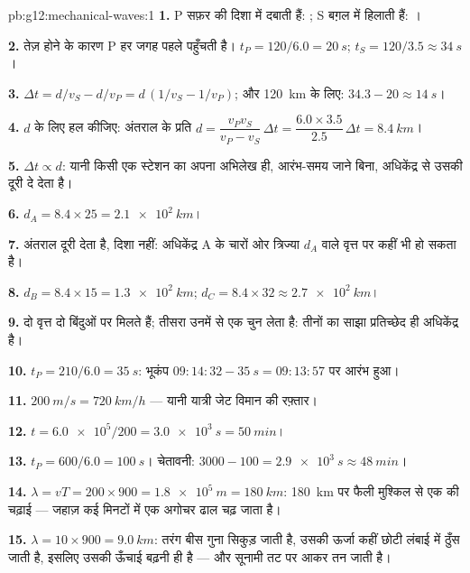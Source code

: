 \begin{solution}{pb:g12:mechanical-waves:1}
\textbf{1.} P सफ़र की दिशा में दबाती हैं: ; S बग़ल में
हिलाती हैं: ।

\textbf{2.} तेज़ होने के कारण P हर जगह पहले पहुँचती है। $t_P = 120/6.0 = \qty{20}{s}$; $t_S = 120/3.5 \approx \qty{34}{s}$।

\textbf{3.} $\Delta t = d/v_S - d/v_P = d\,(1/v_S - 1/v_P)$; और \qty{120}{km} के लिए: $34.3 - 20 \approx \qty{14}{s}$।

\textbf{4.} $d$ के लिए हल कीजिए: अंतराल के प्रति  $d = \dfrac{v_P v_S}{v_P - v_S}\,\Delta t
= \dfrac{6.0 \times 3.5}{2.5}\,\Delta t = \qty{8.4}{km}$।

\textbf{5.} $\Delta t \propto d$: यानी किसी एक स्टेशन का अपना अभिलेख ही, आरंभ-समय जाने
बिना, अधिकेंद्र से उसकी दूरी दे देता है।

\textbf{6.} $d_A = 8.4 \times 25 = \qty{2.1e2}{km}$।

\textbf{7.} अंतराल दूरी देता है, दिशा नहीं: अधिकेंद्र A के चारों ओर त्रिज्या
$d_A$ वाले वृत्त पर कहीं भी हो सकता है।

\textbf{8.} $d_B = 8.4 \times 15 = \qty{1.3e2}{km}$; $d_C = 8.4 \times 32 \approx \qty{2.7e2}{km}$।

\textbf{9.} दो वृत्त दो बिंदुओं पर मिलते हैं; तीसरा उनमें से एक चुन लेता है:
तीनों का साझा प्रतिच्छेद ही अधिकेंद्र है।

\textbf{10.} $t_P = 210/6.0 = \qty{35}{s}$: भूकंप $09{:}14{:}32 - \qty{35}{s} = 09{:}13{:}57$ पर आरंभ हुआ।

\textbf{11.} $\qty{200}{m/s} = \qty{720}{km/h}$ --- यानी यात्री जेट विमान की रफ़्तार।

\textbf{12.} $t = \num{6.0e5}/200 = \qty{3.0e3}{s} = \qty{50}{min}$।

\textbf{13.} $t_P = 600/6.0 = \qty{100}{s}$। चेतावनी: $3000 - 100 = \qty{2.9e3}{s} \approx \qty{48}{min}$।

\textbf{14.} $\lambda = vT = 200 \times 900 = \qty{1.8e5}{m} =
\qty{180}{km}$: \qty{180}{km} पर फैली मुश्किल से एक  की चढ़ाई
--- जहाज़ कई मिनटों में एक अगोचर ढाल चढ़ जाता है।

\textbf{15.} $\lambda = 10 \times 900 = \qty{9.0}{km}$: तरंग बीस गुना सिकुड़ जाती है, उसकी
ऊर्जा कहीं छोटी लंबाई में ठुँस जाती है, इसलिए उसकी ऊँचाई बढ़नी ही
है --- और सूनामी तट पर आकर तन जाती है।


\end{solution}
